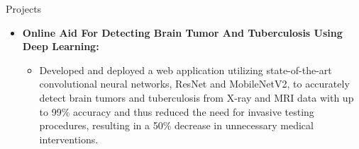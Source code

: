 \documentclass[]{mcdowellcv}
\begin{document}
\begin{cvsection}{Projects}
\begin{cvsubsection}{}{}{}
\begin{itemize}
				\item \textbf{Online Aid For Detecting Brain Tumor And Tuberculosis Using Deep Learning:}
				\begin{itemize}
				    \item Developed and deployed a web application utilizing state-of-the-art convolutional neural networks, ResNet and MobileNetV2, to accurately detect brain tumors and tuberculosis from X-ray and MRI data with up to 99\% accuracy and thus reduced the need for invasive testing procedures, resulting in a 50\% decrease in unnecessary medical interventions.

				\end{itemize}
				
			\end{itemize}
		\end{cvsubsection}
	\end{cvsection}
	
	
	
	
\end{document}
